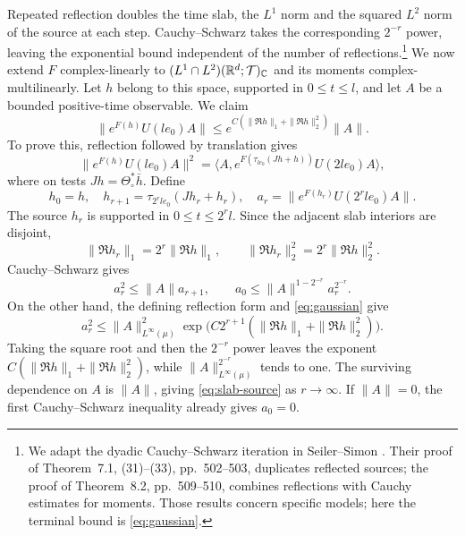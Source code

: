 Repeated reflection doubles the time slab, the $L^1$ norm and the
squared $L^2$ norm of the source at each step. Cauchy--Schwarz takes
the corresponding $2^{-r}$ power, leaving the exponential bound
independent of the number of reflections.\footnote{We adapt the dyadic
Cauchy--Schwarz iteration in Seiler--Simon
\cite[Theorem~4.3, (23)--(24), p.~490]{SeilerSimon}. Their proof of
Theorem~7.1, (31)--(33), pp.~502--503, duplicates reflected sources;
the proof of Theorem~8.2, pp.~509--510, combines reflections with
Cauchy estimates for moments. Those results concern specific models;
here the terminal bound is \eqref{eq:gaussian}.}
We now extend $F$ complex-linearly to
$(L^1\cap L^2)(\mathbb{R}^d;\mathcal{T})_{\mathbb{C}}$ and its moments complex-multilinearly. Let $h$ belong to this space,
supported in $0\leq t\leq l$, and let $A$ be a bounded positive-time
observable. We claim
\begin{equation}\label{eq:slab-source}
 \|e^{F(h)}U(le_0)A\|\leq e^{C(\|\Re h\|_1+\|\Re h\|_2^2)}\|A\|.
\end{equation}
To prove this, reflection followed by translation gives
\begin{equation}
 \|e^{F(h)}U(le_0)A\|^2
 =\big\langle A,e^{F(\tau_{le_0}(Jh+h))}U(2le_0)A\big\rangle,
\end{equation}
where on tests $Jh=\Theta_\circ^*\bar h$. Define
\begin{equation}
 h_0=h,\quad h_{r+1}=\tau_{2^rle_0}(Jh_r+h_r),\quad
 a_r=\|e^{F(h_r)}U(2^rle_0)A\|.
\end{equation}
The source $h_r$ is supported in $0\leq t\leq2^rl$. Since the adjacent
slab interiors are disjoint,
\[
 \|\Re h_r\|_1=2^r\|\Re h\|_1,\qquad
 \|\Re h_r\|_2^2=2^r\|\Re h\|_2^2.
\] Cauchy--Schwarz gives
\begin{equation}
 a_r^2\leq\|A\|a_{r+1},\qquad
 a_0\leq\|A\|^{1-2^{-r}}a_r^{2^{-r}}.
\end{equation}
On the other hand, the defining reflection form and
\eqref{eq:gaussian} give
\begin{equation}
 a_r^2\leq\|A\|_{L^\infty(\mu)}^2
       \exp\bigl(C2^{r+1}(\|\Re h\|_1+\|\Re h\|_2^2)\bigr).
\end{equation}
Taking the square root and then the $2^{-r}$ power leaves the exponent
$C(\|\Re h\|_1+\|\Re h\|_2^2)$, while $\|A\|_{L^\infty(\mu)}^{2^{-r}}$
tends to one. The surviving dependence on $A$ is $\|A\|$, giving
\eqref{eq:slab-source} as $r\to\infty$.
If $\|A\|=0$, the first Cauchy--Schwarz inequality already gives $a_0=0$.

